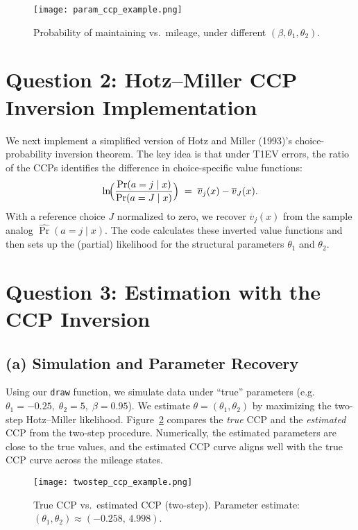 \documentclass[12pt]{article}
\begin{document}
\begin{figure}[h!]
    \centering
    \texttt{[image: param\_ccp\_example.png]}
    \caption{Probability of maintaining vs.\ mileage, under different $(\beta,\theta_1,\theta_2)$.}
    \label{fig:param-ccp}
\end{figure}

\section{Question 2: Hotz--Miller CCP Inversion Implementation}
We next implement a simplified version of Hotz and Miller (1993)’s choice-probability inversion theorem. The key idea is that under T1EV errors, the ratio of the CCPs identifies the difference in choice-specific value functions:
\[
\ln\!\Bigl(\frac{\Pr(a=j\mid x)}{\Pr(a=J\mid x)}\Bigr)
\;=\;
\overline{v}_j(x) - \overline{v}_J(x).
\]
With a reference choice $J$ normalized to zero, we recover $\overline{v}_j(x)$ from the sample analog $\widehat{\Pr}(a=j\mid x)$. The code calculates these inverted value functions and then sets up the (partial) likelihood for the structural parameters $\theta_1$ and $\theta_2$.

\section{Question 3: Estimation with the CCP Inversion}
\label{sec:Q3}
\subsection*{(a) Simulation and Parameter Recovery}
Using our \texttt{draw} function, we simulate data under ``true'' parameters (e.g.\ $\theta_1=-0.25,\;\theta_2=5,\;\beta=0.95$). We estimate $\theta=(\theta_1,\theta_2)$ by maximizing the two-step Hotz--Miller likelihood. Figure~\ref{fig:twostep-ccp} compares the \emph{true} CCP and the \emph{estimated} CCP from the two-step procedure. Numerically, the estimated parameters are close to the true values, and the estimated CCP curve aligns well with the true CCP curve across the mileage states.

\begin{figure}[h!]
    \centering
    \texttt{[image: twostep\_ccp\_example.png]}
    \caption{True CCP vs.\ estimated CCP (two-step). Parameter estimate: $(\theta_1,\theta_2)\approx(-0.258,\,4.998)$.}
    \label{fig:twostep-ccp}
\end{figure}
\end{document}
